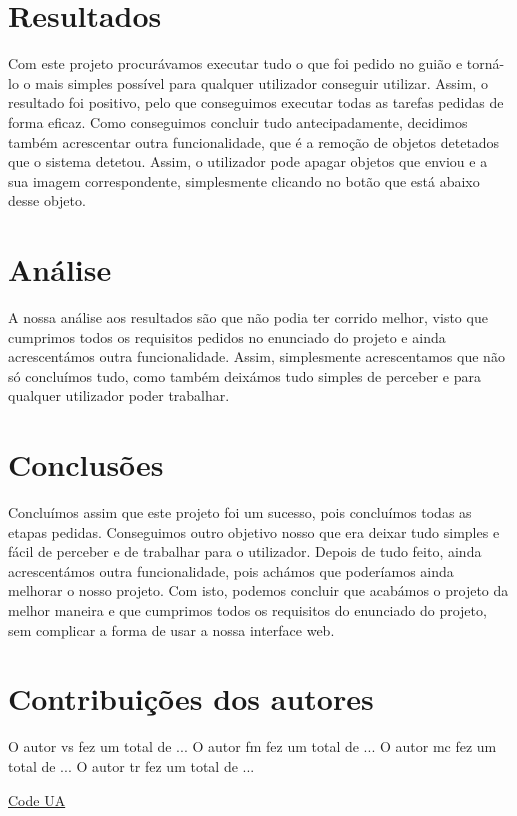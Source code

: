 \documentclass{report}
\begin{document}
\chapter{Resultados}
\label{chap.resultados}
Com este projeto procurávamos executar tudo o que foi pedido no guião e torná-lo o mais simples possível para qualquer utilizador conseguir utilizar. Assim, o resultado foi positivo, pelo que conseguimos executar todas as tarefas pedidas de forma eficaz. Como conseguimos concluir tudo antecipadamente, decidimos também acrescentar outra funcionalidade, que é a remoção de objetos detetados que o sistema detetou. Assim, o utilizador pode apagar objetos que enviou e a sua imagem correspondente, simplesmente clicando no botão que está abaixo desse objeto.

\chapter{Análise}
\label{chap.analise}
A nossa análise aos resultados são que não podia ter corrido melhor, visto que cumprimos todos os requisitos pedidos no enunciado do projeto e ainda acrescentámos outra funcionalidade. Assim, simplesmente acrescentamos que não só concluímos tudo, como também deixámos tudo simples de perceber e para qualquer utilizador poder trabalhar.

\chapter{Conclusões}
\label{chap.conclusao}
Concluímos assim que este projeto foi um sucesso, pois concluímos todas as etapas pedidas. Conseguimos outro objetivo nosso que era deixar tudo simples e fácil de perceber e de trabalhar para o utilizador. Depois de tudo feito, ainda acrescentámos outra funcionalidade, pois achámos que poderíamos ainda melhorar o nosso projeto. Com isto, podemos concluir que acabámos o projeto da melhor maneira e que cumprimos todos os requisitos do enunciado do projeto, sem complicar a forma de usar a nossa interface web.

\chapter*{Contribuições dos autores}
O autor \ac{vs} fez um total de ...
O autor \ac{fm} fez um total de ...
O autor \ac{mc} fez um total de ...
O autor \ac{tr} fez um total de ...\\
\begin{center}\LARGE{
\href{https://code.ua.pt/projects/labi2019-p2-g12}{Code UA}
}\end{center}
\end{document}
